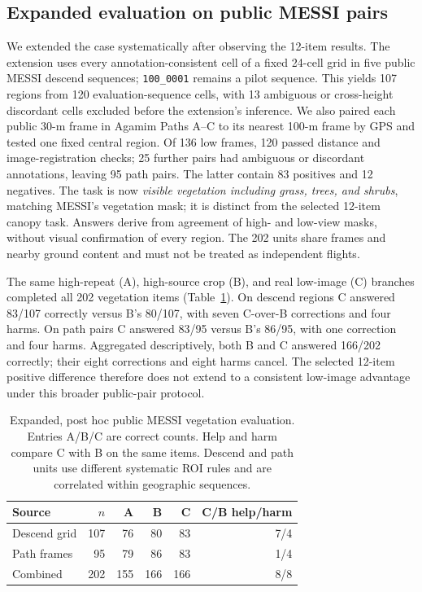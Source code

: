 \subsection{Expanded evaluation on public MESSI pairs}
\label{sec:messi-expanded}
We extended the case systematically after observing the 12-item results. The extension uses every annotation-consistent cell of a fixed 24-cell grid in five public MESSI descend sequences; \texttt{100\_0001} remains a pilot sequence. This yields 107 regions from 120 evaluation-sequence cells, with 13 ambiguous or cross-height discordant cells excluded before the extension's inference. We also paired each public 30-m frame in Agamim Paths A--C to its nearest 100-m frame by GPS and tested one fixed central region. Of 136 low frames, 120 passed distance and image-registration checks; 25 further pairs had ambiguous or discordant annotations, leaving 95 path pairs. The latter contain 83 positives and 12 negatives. The task is now \emph{visible vegetation including grass, trees, and shrubs}, matching MESSI's vegetation mask; it is distinct from the selected 12-item canopy task. Answers derive from agreement of high- and low-view masks, without visual confirmation of every region. The 202 units share frames and nearby ground content and must not be treated as independent flights.

The same high-repeat (A), high-source crop (B), and real low-image (C) branches completed all 202 vegetation items (Table~\ref{tab:messi-expanded}). On descend regions C answered 83/107 correctly versus B's 80/107, with seven C-over-B corrections and four harms. On path pairs C answered 83/95 versus B's 86/95, with one correction and four harms. Aggregated descriptively, both B and C answered 166/202 correctly; their eight corrections and eight harms cancel. The selected 12-item positive difference therefore does not extend to a consistent low-image advantage under this broader public-pair protocol.

\begin{table}[htbp]
\centering\small
\caption{Expanded, post hoc public MESSI vegetation evaluation. Entries A/B/C are correct counts. Help and harm compare C with B on the same items. Descend and path units use different systematic ROI rules and are correlated within geographic sequences.}
\label{tab:messi-expanded}
\begin{tabular}{lrrrrr}
\toprule
Source & $n$ & A & B & C & C/B help/harm\\
\midrule
Descend grid & 107 & 76 & 80 & 83 & 7/4\\
Path frames & 95 & 79 & 86 & 83 & 1/4\\
Combined & 202 & 155 & 166 & 166 & 8/8\\
\bottomrule
\end{tabular}
\end{table}

